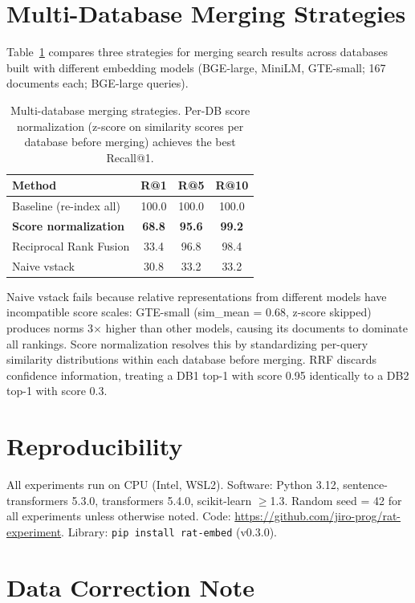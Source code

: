 \documentclass{article}
\begin{document}
\section{Multi-Database Merging Strategies}
\label{app:multidb}

Table~\ref{tab:multidb} compares three strategies for merging search results across databases built with different embedding models (BGE-large, MiniLM, GTE-small; 167 documents each; BGE-large queries).

\begin{table}[h]
\centering
\caption{Multi-database merging strategies. Per-DB score normalization (z-score on similarity scores per database before merging) achieves the best Recall@1.}
\label{tab:multidb}
\begin{tabular}{@{}lccc@{}}
\toprule
Method & R@1 & R@5 & R@10 \\
\midrule
Baseline (re-index all) & 100.0 & 100.0 & 100.0 \\
\textbf{Score normalization} & \textbf{68.8} & \textbf{95.6} & \textbf{99.2} \\
Reciprocal Rank Fusion & 33.4 & 96.8 & 98.4 \\
Naive vstack & 30.8 & 33.2 & 33.2 \\
\bottomrule
\end{tabular}
\end{table}

Naive vstack fails because relative representations from different models have incompatible score scales: GTE-small (sim\_mean = 0.68, z-score skipped) produces norms 3$\times$ higher than other models, causing its documents to dominate all rankings. Score normalization resolves this by standardizing per-query similarity distributions within each database before merging. RRF discards confidence information, treating a DB1 top-1 with score 0.95 identically to a DB2 top-1 with score 0.3.

\section{Reproducibility}
\label{app:repro}

All experiments run on CPU (Intel, WSL2). Software: Python 3.12, sentence-transformers 5.3.0, transformers 5.4.0, scikit-learn $\geq$1.3. Random seed = 42 for all experiments unless otherwise noted. Code: \url{https://github.com/jiro-prog/rat-experiment}. Library: \texttt{pip install rat-embed} (v0.3.0).

\section{Data Correction Note}
\label{app:correction}
\end{document}
